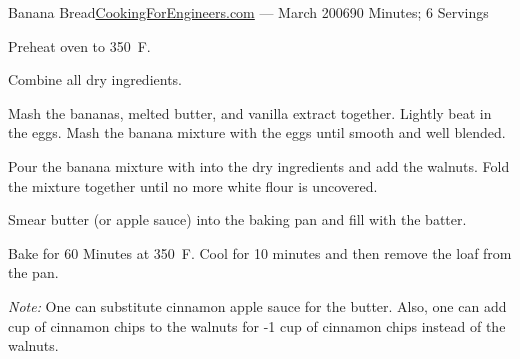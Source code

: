 \documentclass{article}
\begin{document}
\begin{recipe}{Banana Bread}{\href{http://www.cookingforengineers.com/recipe/108/Banana-Nut-Bread}{CookingForEngineers.com} --- March 2006}{90 Minutes; 6 Servings}

   \newstep
   Preheat oven to 350\ \0F.

   Combine all dry ingredients.

   Mash the bananas, melted butter, and vanilla extract together.  Lightly beat
   in the eggs.  Mash the banana mixture with the eggs until smooth and well
   blended.  

   Pour the banana mixture with into the dry ingredients and add the walnuts.
   Fold the mixture together until no more white flour is uncovered.

   Smear butter (or apple sauce) into the baking pan and fill with the batter.

   \newstep
   Bake for 60 Minutes at 350\ \0F.  Cool for 10 minutes and then remove the
   loaf from the pan.

   \freeform
   \emph{Note:} One can substitute cinnamon apple sauce for the butter.  Also,
   one can add  cup of cinnamon chips to the walnuts for -1 cup of
   cinnamon chips instead of the walnuts.

\end{recipe}
\end{document}
